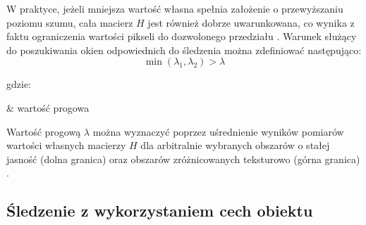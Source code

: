 W praktyce, jeżeli mniejsza wartość własna spełnia założenie o przewyższaniu poziomu szumu, cała macierz $H$ jest również dobrze uwarunkowana, co wynika z faktu ograniczenia wartości pikseli do dozwolonego przedziału \cite{Tomasi1991}. Warunek służący do poszukiwania okien odpowiednich do śledzenia można zdefiniować następująco:
\begin{equation}
\label{equ:Algorytm_Lucasa_Kanade_Tomasi_poszukiwanie_punktow}
	\min (\lambda_1, \lambda_2) > \lambda
\end{equation}

\noindent
gdzie:
\begin{conditions}
	\lambda & wartość progowa \\
\end{conditions}

Wartość progową $\lambda$ można wyznaczyć poprzez uśrednienie wyników pomiarów wartości własnych macierzy $H$ dla arbitralnie wybranych obszarów o stałej jasność (dolna granica) oraz obszarów zróżnicowanych teksturowo (górna granica) \cite{Tomasi1991}.

\subsection{Śledzenie z wykorzystaniem cech obiektu}
\label{subsec:Sledzenie_z_wykorzystaniem_cech}
